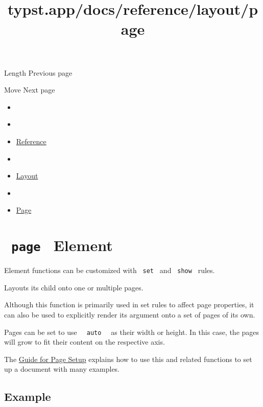 { Length } { Previous page }

\href{/docs/reference/layout/move/}{\pandocbounded{}}

{ Move } { Next page }


\title{typst.app/docs/reference/layout/page}

\begin{itemize}
\tightlist
\item
  \href{/docs}{}
\item
  
\item
  \href{/docs/reference/}{Reference}
\item
  
\item
  \href{/docs/reference/layout/}{Layout}
\item
  
\item
  \href{/docs/reference/layout/page/}{Page}
\end{itemize}

\section{\texorpdfstring{\texttt{\ page\ } {{ Element
}}}{ page   Element }}\label{summary}

\label{element-tooltip}
Element functions can be customized with \texttt{\ set\ } and
\texttt{\ show\ } rules.

Layouts its child onto one or multiple pages.

Although this function is primarily used in set rules to affect page
properties, it can also be used to explicitly render its argument onto a
set of pages of its own.

Pages can be set to use \texttt{\ }{\texttt{\ auto\ }}\texttt{\ } as
their width or height. In this case, the pages will grow to fit their
content on the respective axis.

The \href{/docs/guides/page-setup-guide/}{Guide for Page Setup} explains
how to use this and related functions to set up a document with many
examples.

\subsection{Example}\label{example}

